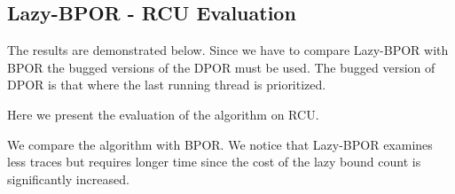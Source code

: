 \subsection{Lazy-BPOR - RCU Evaluation}

The results are demonstrated below. Since we have to compare Lazy-BPOR with BPOR the bugged versions of the DPOR must be used. The bugged version
of DPOR is that where the last running thread is prioritized.

Here we present the evaluation of the algorithm on RCU.




We compare the algorithm with BPOR. We notice that Lazy-BPOR examines less traces but requires longer time since the cost of the lazy bound count is significantly
increased.


